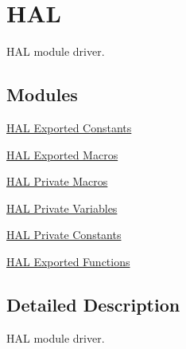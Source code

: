 \hypertarget{group___h_a_l}{}\section{H\+AL}
\label{group___h_a_l}


H\+AL module driver.  


\subsection*{Modules}
\begin{DoxyCompactItemize}
\item 
\hyperlink{group___h_a_l___exported___constants}{H\+A\+L Exported Constants}
\item 
\hyperlink{group___h_a_l___exported___macros}{H\+A\+L Exported Macros}
\item 
\hyperlink{group___h_a_l___private___macros}{H\+A\+L Private Macros}
\item 
\hyperlink{group___h_a_l___private___variables}{H\+A\+L Private Variables}
\item 
\hyperlink{group___h_a_l___private___constants}{H\+A\+L Private Constants}
\item 
\hyperlink{group___h_a_l___exported___functions}{H\+A\+L Exported Functions}
\end{DoxyCompactItemize}


\subsection{Detailed Description}
H\+AL module driver. 


